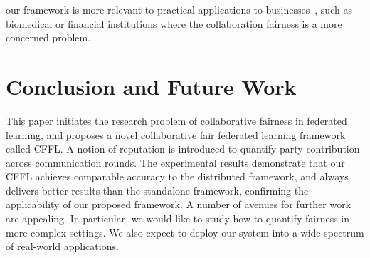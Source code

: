 \documentclass{article}
\begin{document}
our framework is more relevant to practical applications to businesses~\cite{lyu2020threats}, such as biomedical or financial institutions where the collaboration fairness is a more concerned problem.%

\section{Conclusion and Future Work}
\label{sec:Conclusion}
This paper initiates the research problem of collaborative fairness in federated learning, and proposes a novel collaborative fair federated learning framework called CFFL. %
A notion of reputation is introduced to quantify party contribution across communication rounds. %
The experimental results demonstrate that our CFFL achieves comparable accuracy to the distributed  framework, and always delivers better results than the standalone framework, confirming the applicability of our proposed framework. %
A number of avenues for further work are appealing. In particular, we would like to study how to quantify fairness in more complex settings. We also expect to deploy our system into a wide spectrum of real-world applications.






\end{document}

